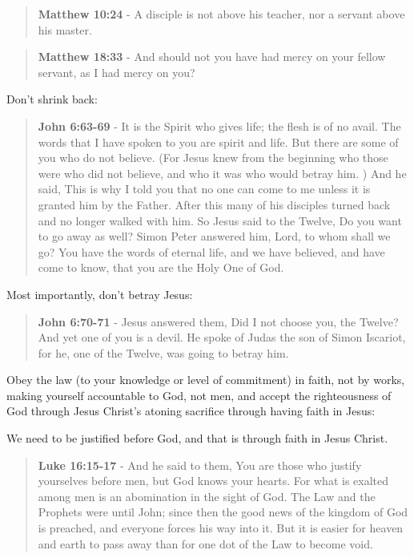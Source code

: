 \documentclass[11pt]{article}
\begin{document}
\begin{quote}
\textbf{Matthew 10:24} - A disciple is not above his teacher, nor a servant above his master.
\end{quote}

\begin{quote}
\textbf{Matthew 18:33} - And should not you have had mercy on your fellow servant, as I had mercy on you?
\end{quote}

Don't shrink back:

\begin{quote}
\textbf{John 6:63-69} - It is the Spirit who gives life; the flesh is of no avail. The words that I have spoken to you are spirit and life. But there are some of you who do not believe. (For Jesus knew from the beginning who those were who did not believe, and who it was who would betray him. ) And he said, This is why I told you that no one can come to me unless it is granted him by the Father. After this many of his disciples turned back and no longer walked with him. So Jesus said to the Twelve, Do you want to go away as well? Simon Peter answered him, Lord, to whom shall we go? You have the words of eternal life, and we have believed, and have come to know, that you are the Holy One of God.
\end{quote}

Most importantly, don't betray Jesus:

\begin{quote}
\textbf{John 6:70-71} - Jesus answered them, Did I not choose you, the Twelve? And yet one of you is a devil. He spoke of Judas the son of Simon Iscariot, for he, one of the Twelve, was going to betray him.
\end{quote}

Obey the law (to your knowledge or level of commitment) in faith, not by works, making yourself accountable to God, not men, and accept the righteousness of God through Jesus Christ's atoning sacrifice through having faith in Jesus:

We need to be justified before God, and that is through faith in Jesus Christ.

\begin{quote}
\textbf{Luke 16:15-17} - And he said to them, You are those who justify yourselves before men, but God knows your hearts. For what is exalted among men is an abomination in the sight of God.  The Law and the Prophets were until John; since then the good news of the kingdom of God is preached, and everyone forces his way into it. But it is easier for heaven and earth to pass away than for one dot of the Law to become void.
\end{quote}
\end{document}
